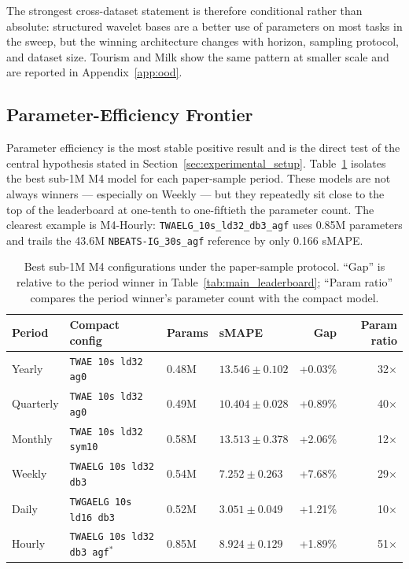 \documentclass{article}
\begin{document}
The strongest cross-dataset statement is therefore conditional rather than absolute: structured wavelet bases are a better use of parameters on most tasks in the sweep, but the winning architecture changes with horizon, sampling protocol, and dataset size. Tourism and Milk show the same pattern at smaller scale and are reported in Appendix~\ref{app:ood}.

\subsection{Parameter-Efficiency Frontier}
\label{sec:param_efficiency}

Parameter efficiency is the most stable positive result and is the direct test of the central hypothesis stated in Section~\ref{sec:experimental_setup}. Table~\ref{tab:sub1m_frontier} isolates the best sub-1M M4 model for each paper-sample period. These models are not always winners --- especially on Weekly --- but they repeatedly sit close to the top of the leaderboard at one-tenth to one-fiftieth the parameter count. The clearest example is M4-Hourly: \texttt{TWAELG\_10s\_ld32\_db3\_agf} uses 0.85M parameters and trails the 43.6M \texttt{NBEATS-IG\_30s\_agf} reference by only 0.166 sMAPE.

\begin{table}[t]
  \caption{Best sub-1M M4 configurations under the paper-sample protocol. ``Gap'' is relative to the period winner in Table~\ref{tab:main_leaderboard}; ``Param ratio'' compares the period winner's parameter count with the compact model.}
  \label{tab:sub1m_frontier}
  \centering
  \scriptsize
  \setlength{\tabcolsep}{3pt}
  \begin{tabular}{llllrr}
    \toprule
    Period & Compact config & Params & sMAPE & Gap & Param ratio \\
    \midrule
    Yearly    & \texttt{TWAE 10s ld32 ag0}        & 0.48M & $13.546 \pm 0.102$ & +0.03\% & 32$\times$ \\
    Quarterly & \texttt{TWAE 10s ld32 ag0}        & 0.49M & $10.404 \pm 0.028$ & +0.89\% & 40$\times$ \\
    Monthly   & \texttt{TWAE 10s ld32 sym10}      & 0.58M & $13.513 \pm 0.378$ & +2.06\% & 12$\times$ \\
    Weekly    & \texttt{TWAELG 10s ld32 db3}      & 0.54M & $7.252 \pm 0.263$  & +7.68\% & 29$\times$ \\
    Daily     & \texttt{TWGAELG 10s ld16 db3}     & 0.52M & $3.051 \pm 0.049$  & +1.21\% & 10$\times$ \\
    Hourly    & \texttt{TWAELG 10s ld32 db3 agf}$^*$ & 0.85M & $8.924 \pm 0.129$ & +1.89\% & 51$\times$ \\
    \bottomrule
  \end{tabular}
\end{table}
\end{document}
